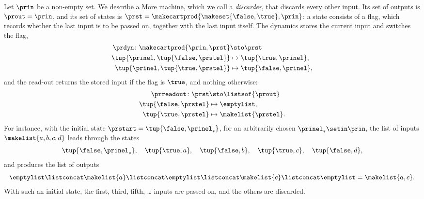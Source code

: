 \begin{example}[Discarder]
    \label{exa:more-discarder}
    Let $\prin$ be a non-empty set.
    We describe a More machine, which we call a \emph{discarder}, that discards every other input.
    Its set of outputs is $\prout = \prin$, and its set of states is $\prst = \makecartprod{\makeset{\false, \true}, \prin}$: a state consists of a flag, which records whether the last input is to be passed on, together with the last input itself.
    The dynamics stores the current input and switches the flag,
    \begin{equation}
        \begin{aligned}
            \prdyn\colon \makecartprod{\prin, \prst} & \sto \prst \\
            \tup{\prinel, \tup{\false, \prstel}}     & \mapsto \tup{\true, \prinel}, \\
            \tup{\prinel, \tup{\true, \prstel}}      & \mapsto \tup{\false, \prinel},
        \end{aligned}
    \end{equation}
    and the read-out returns the stored input if the flag is $\true$, and nothing otherwise:
    \begin{equation}
        \begin{aligned}
            \prreadout\colon \prst    & \sto \listsof{\prout} \\
            \tup{\false, \prstel}     & \mapsto \emptylist, \\
            \tup{\true, \prstel}      & \mapsto \makelist{\prstel}.
        \end{aligned}
    \end{equation}
    For instance, with the initial state $\prstart = \tup{\false, \prinel_\ast}$, for an arbitrarily chosen $\prinel_\ast \setin \prin$, the list of inputs $\makelist{a, b, c, d}$ leads through the states
    \begin{equation*}
        \tup{\false, \prinel_\ast}, \quad \tup{\true, a}, \quad \tup{\false, b}, \quad \tup{\true, c}, \quad \tup{\false, d},
    \end{equation*}
    and produces the list of outputs
    \begin{equation*}
        \emptylist \listconcat \makelist{a} \listconcat \emptylist \listconcat \makelist{c} \listconcat \emptylist = \makelist{a, c}.
    \end{equation*}
    With such an initial state, the first, third, fifth, \dots{} inputs are passed on, and the others are discarded.
\end{example}

